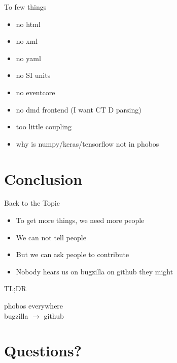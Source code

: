 \documentclass[aspectratio=169,notes]{beamer}
\begin{document}
	\begin{frame}[fragile]{To few things}
		\begin{itemize}
			\item no html
			\item no xml
			\item no yaml
			\item no SI units
			\item no eventcore
			\item no dmd frontend (I want CT D parsing)
			\item too little coupling
			\item why is numpy/keras/tensorflow not in phobos
		\end{itemize}
	\end{frame}

	\section{Conclusion}
	\begin{frame}[fragile]{Back to the Topic}
		\begin{itemize}
			\item To get more things, we need more people
			\item We can not tell people\\[1cm]
			\pause
			\item {\Large But we can ask people to contribute}\\[1cm]
			\pause
			\item {\Large Nobody hears us on bugzilla on github they might}
		\end{itemize}
	\end{frame}
	\begin{frame}[fragile]{TL;DR}
		\Huge
		\begin{center}
		phobos everywhere\\[1cm]
		bugzilla $\rightarrow$ github\\[1cm]
		\end{center}
	\end{frame}
	\section{Questions?}
\end{document}
